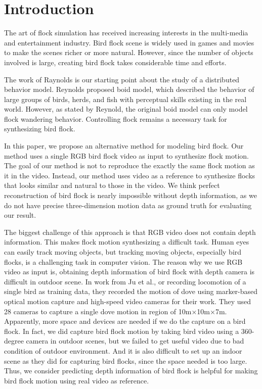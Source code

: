 \chapter{Introduction}


  The art of flock simulation has received increasing interests in the multi-media and entertainment industry. Bird flock scene is widely used in games and movies to make the scenes richer or more natural. However, since the number of objects involved is large, creating bird flock takes considerable time and efforts.


The work of Raynolds \cite{Boid, Steering} is our starting point about the study of a distributed behavior model. Reynolds proposed boid model, which described the behavior of large groups of birds, herds, and fish with perceptual skills existing in the real world. However, as stated by Reynold, the original boid model can only model flock wandering behavior. Controlling flock remains a necessary task for synthesizing bird flock. 


In this paper, we propose an alternative method for modeling bird flock. Our method uses a single RGB bird flock video as input to synthesize flock motion. The goal of our method is not to reproduce the exactly the same flock motion as it in the video. Instead, our method uses video as a reference to synthesize flocks that looks similar and natural to those in the video. We think perfect reconstruction of bird flock is nearly impossible without depth information, as we do not have precise three-dimension motion data as ground truth for evaluating our result.



The biggest challenge of this approach is that RGB video does not contain depth information. This makes flock motion synthesizing a difficult task. Human eyes can easily track moving objects, but tracking moving objects, especially bird flocks, is a challenging task in computer vision. The reason why we use RGB video as input is, obtaining depth information of bird flock with depth camera is difficult in outdoor scene. In work from Ju et al.\cite{Flappy}, or recording locomotion of a single bird as training data, they recorded the motion of dove using marker-based optical motion capture and high-speed video cameras for their work. They used 28 cameras to capture a single dove motion in region of 10m×10m×7m. Apparently, more space and devices are needed if we do the capture on a bird flock. In fact, we did capture bird flock motion by taking bird video using a 360-degree camera in outdoor scenes, but we failed to get useful video due to bad condition of outdoor environment. And it is also difficult to set up an indoor scene as they did for capturing bird flocks, since the space needed is too large. Thus, we consider predicting depth information of bird flock is helpful for making bird flock motion using real video as reference.


